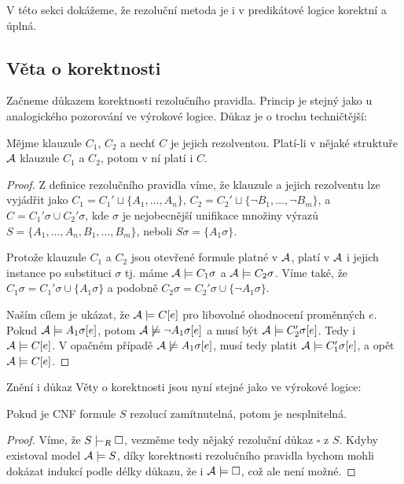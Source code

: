 V této sekci dokážeme, že rezoluční metoda je i v predikátové logice korektní a úplná.

\subsection{Věta o korektnosti}

Začneme důkazem korektnosti rezolučního pravidla. Princip je stejný jako u analogického pozorování ve výrokové logice. Důkaz je o trochu techničtější:

\begin{proposition}
Mějme klauzule $C_1$, $C_2$ a nechť $C$ je jejich rezolventou. Platí-li v nějaké struktuře $\mathcal{A}$ klauzule $C_1$ a $C_2$, potom v ní platí i $C$.
\end{proposition}
\begin{proof}
Z definice rezolučního pravidla víme, že klauzule a jejich rezolventu lze vyjádřit jako $C_1=C_1'\sqcup \{A_1,\dots,A_n\}$, $C_2=C_2'\sqcup \{\neg B_1,\dots,\neg B_m\}$, a $C=C_1'\sigma \cup C_2'\sigma$, kde $\sigma$ je
nejobecnější unifikace množiny výrazů $S=\{A_1,\dots,A_n,B_1,\dots,B_m\}$, neboli $S\sigma=\{A_1\sigma\}$.

Protože klauzule $C_1$ a $C_2$ jsou otevřené formule platné v $\mathcal{A}$, platí v $\mathcal{A}$ i jejich instance po substituci $\sigma$ tj. máme $\mathcal{A}\models C_1\sigma$ a $\mathcal{A}\models C_2\sigma$. Víme také, že $C_1\sigma=C_1'\sigma \cup \{A_1\sigma\}$ a podobně $C_2\sigma=C_2'\sigma \cup \{\neg A_1\sigma\}$.

Naším cílem je ukázat, že $\mathcal{A}\models C[e]$ pro libovolné ohodnocení proměnných $e$. Pokud $\mathcal{A}\models A_1\sigma[e]$, potom $\mathcal{A}\not\models\neg A_1\sigma[e]$ a musí být $\mathcal{A}\models C_2'\sigma[e]$. Tedy i $\mathcal{A}\models C[e]$. V opačném případě $\mathcal{A}\not\models A_1\sigma[e]$, musí tedy platit $\mathcal{A}\models C_1'\sigma[e]$, a opět $\mathcal{A}\models C[e]$.
\end{proof}

Znění i důkaz Věty o korektnosti jsou nyní stejné jako ve výrokové logice:

\begin{theorem}\label{theorem:soundness-of-predicate-resolution}
    Pokud je CNF formule $S$ rezolucí zamítnutelná, potom je nesplnitelná.
\end{theorem}
\begin{proof}
    Víme, že $S\proves_R\square$, vezměme tedy nějaký rezoluční důkaz $\square$ z $S$. Kdyby existoval model $\mathcal{A}\models S$, díky korektnosti rezolučního pravidla bychom mohli dokázat indukcí podle délky důkazu, že i $\mathcal{A}\models\square$, což ale není možné.
\end{proof}



